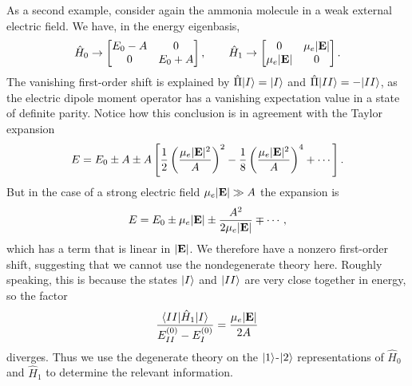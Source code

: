 \documentclass[../p116main.tex]{subfiles}
\begin{document}
As a second example, consider again the ammonia molecule in a weak external electric field.
We have, in the energy eigenbasis,
\[ \hat H_0 \to \begin{bmatrix} E_0 - A & 0 \\ 0 & E_0 + A \end{bmatrix}, \qquad \hat H_1 \to \begin{bmatrix} 0 & \mu_e |\mathbf{E}| \\ \mu_e |\mathbf{E}| & 0 \end{bmatrix}. \]
The vanishing first-order shift is explained by $\hat \Pi |{I}\rangle = |{I}\rangle$ and $\hat \Pi |{II}\rangle = -|{II}\rangle$, as the electric dipole moment operator has a vanishing expectation value in a state of definite parity.
Notice how this conclusion is in agreement with the Taylor expansion
\[ E = E_0 \pm A \pm A \left[ \frac{1}{2} \left( \frac{\mu_e |\mathbf{E}|^2}{A} \right)^2 - \frac{1}{8} \left( \frac{\mu_e |\mathbf{E}|^2}{A} \right)^4 + \cdots \right]. \]
But in the case of a strong electric field $\mu_e |\mathbf{E}| \gg A$ the expansion is
\[ E = E_0 \pm \mu_e |\mathbf{E}| \pm \frac{A^2}{2\mu_e |\mathbf{E}|} \mp \cdots, \]
which has a term that is linear in $|\mathbf{E}|$.
We therefore have a nonzero first-order shift, suggesting that we cannot use the nondegenerate theory here.
Roughly speaking, this is because the states $|{I}\rangle$ and $|{II}\rangle$ are very close together in energy, so the factor
\[ \frac{\langle{II}| \hat H_1 |{I}\rangle}{E_{II}^{(0)} - E_I^{(0)}} = \frac{\mu_e |\mathbf{E}|}{2A} \]
diverges.
Thus we use the degenerate theory on the $|{1}\rangle$-$|{2}\rangle$ representations of $\hat H_0$ and $\hat H_1$ to determine the relevant information.
\end{document}
